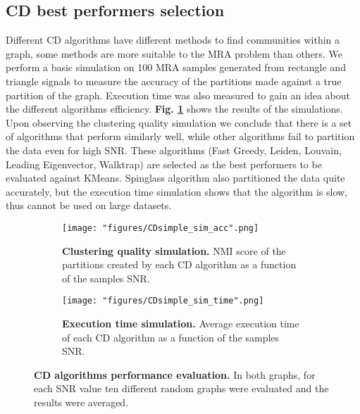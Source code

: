 \subsection{\acrlong{CD} best performers selection}
Different \acrshort{CD} algorithms have different methods to find communities within a graph, some methods are more suitable to the \acrshort{MRA} problem than others. We perform a basic simulation on 100 \acrshort{MRA} samples generated from rectangle and triangle signals to measure the accuracy of the partitions made against a true partition of the graph. Execution time was also measured to gain an idea about the different algorithms efficiency. \textbf{Fig. \ref{fig:basic_sim}} shows the results of the simulations. Upon observing the clustering quality simulation we conclude that there is a set of algorithms that perform similarly well, while other algorithms fail to partition the data even for high \acrshort{SNR}. These algorithms (Fast Greedy, Leiden, Louvain, Leading Eigenvector, Walktrap) are selected as the best performers to be evaluated against KMeans. Spinglass algorithm also partitioned the data quite accurately, but the execution time simulation shows that the algorithm is slow, thus cannot be used on large datasets.

\clearpage

\begin{figure}[h]
\begin{subfigure}[h]{0.49\linewidth}
\texttt{[image: "figures/CDsimple\_sim\_acc".png]}
\caption{\textbf{Clustering quality simulation.} \acrshort{NMI} score of the partitions created by each \acrshort{CD} algorithm as a function of the samples \acrshort{SNR}.}
\end{subfigure}
\hfill
\begin{subfigure}[h]{0.49\linewidth}
\texttt{[image: "figures/CDsimple\_sim\_time".png]}
\caption{\textbf{Execution time simulation.} Average execution time of each \acrshort{CD} algorithm as a function of the samples \acrshort{SNR}.}
\end{subfigure}
\caption{\textbf{\acrlong{CD} algorithms performance evaluation.} In both graphs, for each \acrshort{SNR} value ten different random graphs were evaluated and the results were averaged.}
\label{fig:basic_sim}
\end{figure}

